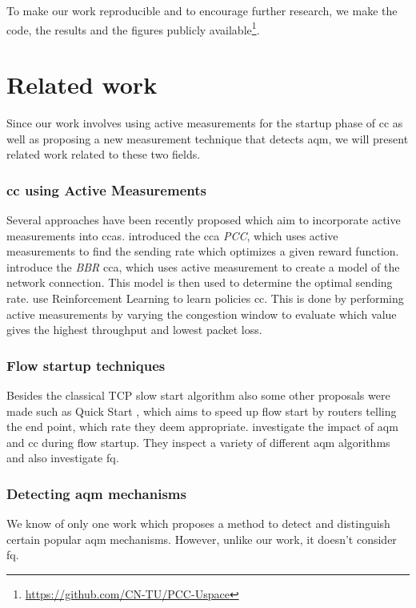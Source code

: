\documentclass[runningheads]{llncs}
\begin{document}
To make our work reproducible and to encourage further research, we make the code, the results and the figures publicly available\footnote{\url{https://github.com/CN-TU/PCC-Uspace}}. 

\section{Related work}

Since our work involves using active measurements for the startup phase of \gls{cc} as well as proposing a new measurement technique that detects \gls{aqm}, we will present related work related to these two fields. 

\subsubsection{\gls{cc} using Active Measurements}
Several approaches have been recently proposed which aim to incorporate active measurements into \glspl{cca}. \cite{dong_pcc_2015,dong_pcc_2018} introduced the \gls{cca} \textit{PCC}, which uses active measurements to find the sending rate which optimizes a given reward function. \cite{cardwell_bbr:_2016} introduce the \textit{BBR} \gls{cca}, which uses active measurement to create a model of the network connection. This model is then used to determine the optimal sending rate. \cite{bachl_rax_2019} use Reinforcement Learning to learn policies \gls{cc}. This is done by performing active measurements by varying the congestion window to evaluate which value gives the highest throughput and lowest packet loss. 

\subsubsection{Flow startup techniques} Besides the classical TCP slow start algorithm \cite{stevens_tcp_1997} also some other proposals were made such as Quick Start \cite{jain_quick-start_2019}, which aims to speed up flow start by routers telling the end point, which rate they deem appropriate. \cite{jarvinen_congestion_2019} investigate the impact of \gls{aqm} and \gls{cc} during flow startup. They inspect a variety of different \gls{aqm} algorithms and also investigate \gls{fq}. 

\subsubsection{Detecting \gls{aqm} mechanisms} We know of only one work \cite{kargar_bideh_tada_2016} which proposes a method to detect and distinguish certain popular \gls{aqm} mechanisms. However, unlike our work, it doesn't consider \gls{fq}. 
\end{document}
